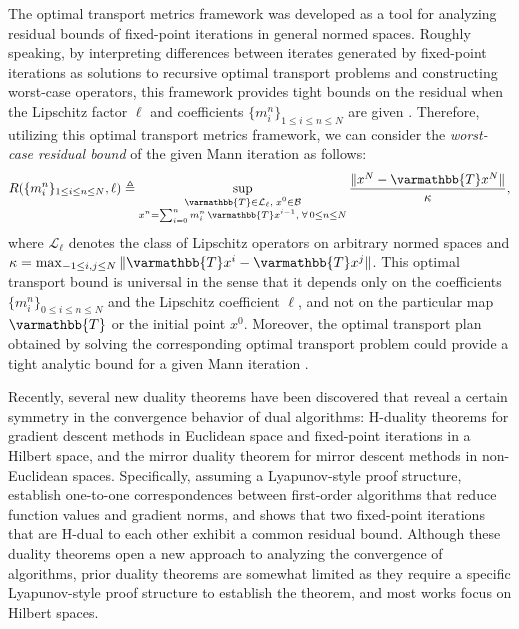 \documentclass[pdflatex,sn-mathphys-num]{sn-jnl}%
\newcommand{\cB}{\mathcal{B}}
\newcommand{\cL}{\mathcal{L}}
\newcommand{\opT}{{\varmathbb{T}}}
\theoremstyle{thmstyleone}%
\theoremstyle{thmstyletwo}%
\theoremstyle{thmstylethree}%
\begin{document}
The optimal transport metrics framework \cite{baillon1992optimal} was developed as a tool for analyzing residual bounds of fixed-point iterations in general normed spaces. Roughly speaking, by interpreting differences between iterates generated by fixed-point iterations as solutions to recursive optimal transport problems and constructing worst-case operators, this framework provides tight bounds on the residual when the Lipschitz factor $\ell$ and coefficients $\{m^n_i\}_{1 \le i \le n \le N}$ are given \cite{bravo2021universal, cc2023, bravo2026minimax}. Therefore, utilizing this optimal transport metrics framework, we can consider the \emph{worst-case residual bound} of the given Mann iteration as follows:
\[
R(\{m^n_i\}_{1 \le i \le n \le N}, \ell)
\triangleq
\sup_{\substack{
\opT\in\cL_\ell,\; x^0\in\cB\\
x^n=\sum^n_{i=0}m^n_i\,\opT x^{i-1},\;\forall\,0\le n\le N
}}
\frac{\|x^N-\opT x^N\|}{\kappa},
\]
where $\cL_\ell$ denotes the class of Lipschitz operators on arbitrary normed spaces and $\kappa=\max_{-1\le i,j\le N}\|\opT x^i-\opT x^j\|$.
This optimal transport bound is universal in the sense that it depends only on the coefficients $\{m^n_i\}_{0\le i \le n \le N}$ and the Lipschitz coefficient $\ell$, and not on the particular map $\opT$ or the initial point $x^{0}$. Moreover, the optimal transport plan obtained by solving the corresponding optimal transport problem could provide a tight analytic bound for a given Mann iteration \cite{bc2018, cc2023, bravo2026minimax, bravo2026krasnosel}.


Recently, several new duality theorems have been discovered that reveal a certain symmetry in the convergence behavior of dual algorithms: H-duality theorems \cite{kim2023time, yoon2024optimal} for gradient descent methods in Euclidean space and fixed-point iterations in a Hilbert space, and the mirror duality theorem \cite{kim2023mirror} for mirror descent methods in non-Euclidean spaces. Specifically, assuming a Lyapunov-style proof structure, \cite{kim2023time, kim2023mirror} establish one-to-one correspondences between first-order algorithms that reduce function values and gradient norms, and \cite{yoon2024optimal} shows that two fixed-point iterations that are H-dual to each other exhibit a common residual bound. Although these duality theorems open a new approach to analyzing the convergence of algorithms, prior duality theorems are somewhat limited as they require a specific Lyapunov-style proof structure to establish the theorem, and most works focus on Hilbert spaces.
\end{document}
